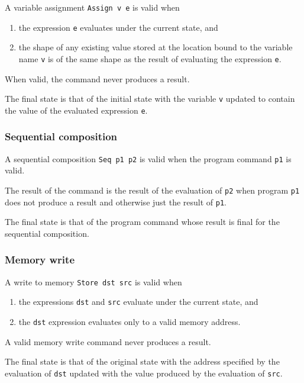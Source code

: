 \documentclass[graybox,envcountsect]{SVMonoEnhanced}
\begin{document}
A variable assignment \lstinline!Assign v e! is valid when
\begin{enumerate}
  \item the expression \lstinline!e! evaluates under the current state, and
  \item the shape of any existing value stored at the location bound to the variable name \lstinline!v! is of the same shape as the result of evaluating the expression \lstinline!e!.
\end{enumerate}

When valid, the command never produces a result.

The final state is that of the initial state with the variable \lstinline!v! updated to contain the value of the evaluated expression \lstinline!e!.

\subsubsection{Sequential composition}
\label{sec:sequ-comp}

A sequential composition \lstinline!Seq p1 p2! is valid when the program command \lstinline!p1! is valid.

The result of the command is the result of the evaluation of \lstinline!p2! when program \lstinline!p1! does not produce a result and otherwise just the result of \lstinline!p1!.

The final state is that of the program command whose result is final for the sequential composition.

\subsubsection{Memory write}
\label{sec:memory-write}

A write to memory \lstinline!Store dst src! is valid when
\begin{enumerate}
  \item the expressions \lstinline!dst! and \lstinline!src! evaluate under the current state, and
  \item the \lstinline!dst! expression evaluates only to a valid memory address.
\end{enumerate}

A valid memory write command never produces a result.

The final state is that of the original state with the address specified by the evaluation of \lstinline!dst! updated with the value produced by the evaluation of \lstinline!src!.
\end{document}
